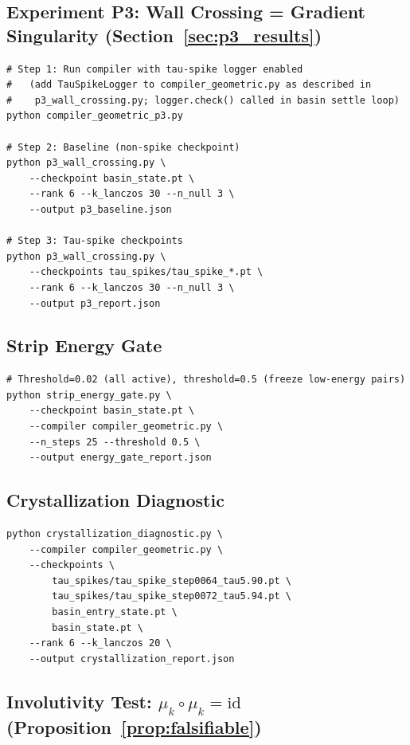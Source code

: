 \documentclass[11pt]{amsart}
\begin{document}
\subsection*{Experiment P3: Wall Crossing = Gradient Singularity
  (Section~\ref{sec:p3_results})}

\begin{verbatim}
# Step 1: Run compiler with tau-spike logger enabled
#   (add TauSpikeLogger to compiler_geometric.py as described in
#    p3_wall_crossing.py; logger.check() called in basin settle loop)
python compiler_geometric_p3.py

# Step 2: Baseline (non-spike checkpoint)
python p3_wall_crossing.py \
    --checkpoint basin_state.pt \
    --rank 6 --k_lanczos 30 --n_null 3 \
    --output p3_baseline.json

# Step 3: Tau-spike checkpoints
python p3_wall_crossing.py \
    --checkpoints tau_spikes/tau_spike_*.pt \
    --rank 6 --k_lanczos 30 --n_null 3 \
    --output p3_report.json
\end{verbatim}

\subsection*{Strip Energy Gate}

\begin{verbatim}
# Threshold=0.02 (all active), threshold=0.5 (freeze low-energy pairs)
python strip_energy_gate.py \
    --checkpoint basin_state.pt \
    --compiler compiler_geometric.py \
    --n_steps 25 --threshold 0.5 \
    --output energy_gate_report.json
\end{verbatim}

\subsection*{Crystallization Diagnostic}

\begin{verbatim}
python crystallization_diagnostic.py \
    --compiler compiler_geometric.py \
    --checkpoints \
        tau_spikes/tau_spike_step0064_tau5.90.pt \
        tau_spikes/tau_spike_step0072_tau5.94.pt \
        basin_entry_state.pt \
        basin_state.pt \
    --rank 6 --k_lanczos 20 \
    --output crystallization_report.json
\end{verbatim}

\subsection*{Involutivity Test: $\mu_k \circ \mu_k = \mathrm{id}$
  (Proposition~\ref{prop:falsifiable})}
\end{document}
